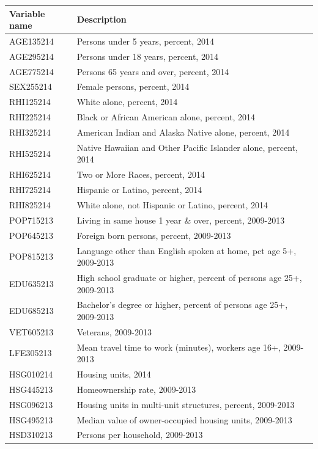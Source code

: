 \documentclass[12pt]{article}
\newcommand{\<}{\langle}
\renewcommand{\>}{\rangle}
\begin{document}
\begin{table}[!]
\renewcommand{\arraystretch}{0.65}
\begin{center}
\begin{tabular}{l|l}
\Xhline{1.25pt}
Variable name  & Description \\ 
\hline
AGE135214 &  Persons under 5 years, percent, 2014 \\ 
AGE295214 &  Persons under 18 years, percent, 2014 \\ 
AGE775214 &  Persons 65 years and over, percent, 2014 \\ 
SEX255214 &  Female persons, percent, 2014 \\ 
RHI125214 &  White alone, percent, 2014 \\ 
RHI225214 &  Black or African American alone, percent, 2014 \\ 
RHI325214 &  American Indian and Alaska Native alone, percent, 2014 \\ 
RHI525214 &  Native Hawaiian and Other Pacific Islander alone, percent, 2014 \\ 
RHI625214 &  Two or More Races, percent, 2014 \\ 
RHI725214 &  Hispanic or Latino, percent, 2014 \\ 
RHI825214 &  White alone, not Hispanic or Latino, percent, 2014 \\ 
POP715213 &  Living in same house 1 year \& over, percent, 2009-2013 \\ 
POP645213 &  Foreign born persons, percent, 2009-2013 \\ 
POP815213 &  Language other than English spoken at home, pct age 5+, 2009-2013 \\ 
EDU635213 &  High school graduate or higher, percent of persons age 25+, 2009-2013 \\ 
EDU685213 &  Bachelor's degree or higher, percent of persons age 25+, 2009-2013 \\ 
VET605213 &  Veterans, 2009-2013 \\ 
LFE305213 &  Mean travel time to work (minutes), workers age 16+, 2009-2013 \\ 
HSG010214 &  Housing units, 2014 \\ 
HSG445213 &  Homeownership rate, 2009-2013 \\ 
HSG096213 &  Housing units in multi-unit structures, percent, 2009-2013 \\ 
HSG495213 &  Median value of owner-occupied housing units, 2009-2013 \\ 
HSD310213 &  Persons per household, 2009-2013 \\ 

\end{tabular}
\end{center}
\end{table}
\end{document}
